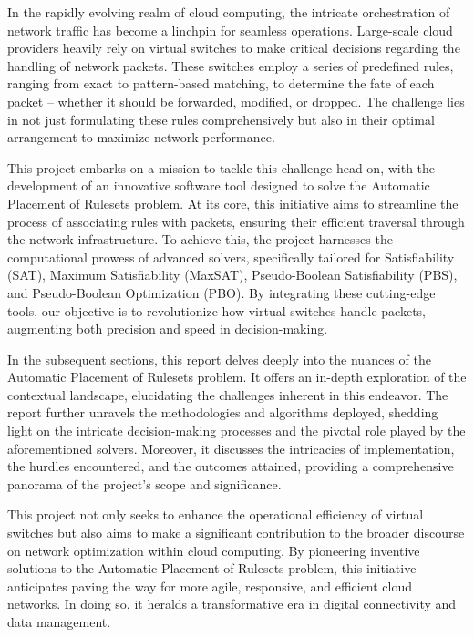 In the rapidly evolving realm of cloud computing, the intricate orchestration of network traffic has become a linchpin for seamless operations. Large-scale cloud providers heavily rely on virtual switches to make critical decisions regarding the handling of network packets. These switches employ a series of predefined rules, ranging from exact to pattern-based matching, to determine the fate of each packet – whether it should be forwarded, modified, or dropped. The challenge lies in not just formulating these rules comprehensively but also in their optimal arrangement to maximize network performance.

This project embarks on a mission to tackle this challenge head-on, with the development of an innovative software tool designed to solve the Automatic Placement of Rulesets problem. At its core, this initiative aims to streamline the process of associating rules with packets, ensuring their efficient traversal through the network infrastructure. To achieve this, the project harnesses the computational prowess of advanced solvers, specifically tailored for Satisfiability (SAT), Maximum Satisfiability (MaxSAT), Pseudo-Boolean Satisfiability (PBS), and Pseudo-Boolean Optimization (PBO). By integrating these cutting-edge tools, our objective is to revolutionize how virtual switches handle packets, augmenting both precision and speed in decision-making.

In the subsequent sections, this report delves deeply into the nuances of the Automatic Placement of Rulesets problem. It offers an in-depth exploration of the contextual landscape, elucidating the challenges inherent in this endeavor. The report further unravels the methodologies and algorithms deployed, shedding light on the intricate decision-making processes and the pivotal role played by the aforementioned solvers. Moreover, it discusses the intricacies of implementation, the hurdles encountered, and the outcomes attained, providing a comprehensive panorama of the project's scope and significance.

This project not only seeks to enhance the operational efficiency of virtual switches but also aims to make a significant contribution to the broader discourse on network optimization within cloud computing. By pioneering inventive solutions to the Automatic Placement of Rulesets problem, this initiative anticipates paving the way for more agile, responsive, and efficient cloud networks. In doing so, it heralds a transformative era in digital connectivity and data management.

